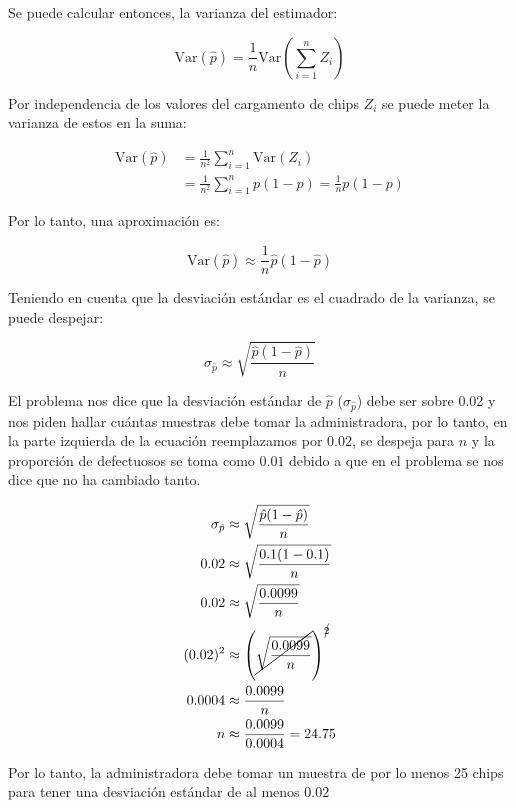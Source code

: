\documentclass[12pt]{article}\usepackage[]{graphicx}\usepackage[]{xcolor}
\begin{document}
Se puede calcular entonces, la varianza del estimador:

\[
\mathrm{Var}(\hat{p}) = \frac{1}{n} \mathrm{Var} \left(\sum_{i=1}^{n} Z_{i} \right)
\]

Por independencia de los valores del cargamento de chips $Z_{i}$ se puede meter la varianza de estos en la suma:

\begin{align*}
  \mathrm{Var}(\hat{p}) &= \frac{1}{n^{2}} \sum_{i=1}^{n} \mathrm{Var}(Z_{i}) \\
  &= \frac{1}{n^{2}} \sum_{i=1}^{n} p(1 - p) = \frac{1}{n} p (1 -p) 
\end{align*}

Por lo tanto, una aproximación es:

\[
\mathrm{Var}(\hat{p}) \approx \frac{1}{n} \hat{p} (1 - \hat{p}) 
\]

Teniendo en cuenta que la desviación estándar es el cuadrado de la varianza, se puede despejar:

\[
\sigma_{\hat{p}} \approx \sqrt{\frac{\hat{p} (1 - \hat{p})}{n}}
\]

El problema nos dice que la desviación estándar de $\hat{p}$ ($\sigma_{\hat{p}}$) debe ser sobre 0.02 y nos piden hallar cuántas muestras debe tomar la administradora, por lo tanto, en la parte izquierda de la ecuación reemplazamos por $0.02$, se despeja para $n$ y la proporción de defectuosos se toma como $0.01$ debido a que en el problema se nos dice que no ha cambiado tanto.

\begin{align*}
  \sigma_{\hat{p}} &\approx \sqrt{\frac{\hat{p} (1 - \hat{p})}{n}} \\
  0.02 &\approx \sqrt{\frac{0.1 (1 - 0.1)}{n}  } \\
  0.02 &\approx \sqrt{\frac{0.0099}{n}  } \\
  (0.02)^{2} &\approx \left(\cancel{\sqrt{\frac{0.0099}{n}  }} \right)^{\cancel{2}}\\
  0.0004 &\approx \frac{0.0099}{n} \\
  n &\approx \frac{0.0099}{0.0004} = 24.75
\end{align*}

Por lo tanto, la administradora debe tomar un muestra de por lo menos 25 chips para tener una desviación estándar de al menos $0.02$
\end{document}
